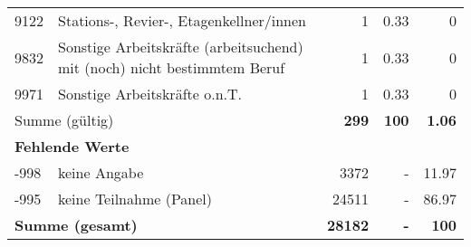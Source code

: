 \begin{longtable}{lXrrr}
        9122 & \multicolumn{1}{X}{Stations-, Revier-, Etagenkellner/innen} & %
          \num{1} &
          \num[round-mode=places,round-precision=2]{0.33} &
          \num[round-mode=places,round-precision=2]{0} \\

        9832 & \multicolumn{1}{X}{Sonstige Arbeitskräfte (arbeitsuchend) mit (noch) nicht bestimmtem Beruf} & %
          \num{1} &
          \num[round-mode=places,round-precision=2]{0.33} &
          \num[round-mode=places,round-precision=2]{0} \\

        9971 & \multicolumn{1}{X}{Sonstige Arbeitskräfte o.n.T.} & %
          \num{1} &
          \num[round-mode=places,round-precision=2]{0.33} &
          \num[round-mode=places,round-precision=2]{0} \\

     \midrule
     \multicolumn{2}{l}{Summe (gültig)} &
       \textbf{\num{299}} &
     \textbf{100} &
       \textbf{\num[round-mode=places,round-precision=2]{1.06}} \\
     \multicolumn{5}{l}{\textbf{Fehlende Werte}}\\
       -998 &
       keine Angabe &
         \num{3372} &
        - &
         \num[round-mode=places,round-precision=2]{11.97} \\
       -995 &
       keine Teilnahme (Panel) &
         \num{24511} &
        - &
         \num[round-mode=places,round-precision=2]{86.97} \\
     \midrule
     \multicolumn{2}{l}{\textbf{Summe (gesamt)}} &
          \textbf{\num{28182}} &
        \textbf{-} &
        \textbf{100} \\
     \bottomrule
     \end{longtable}
     
